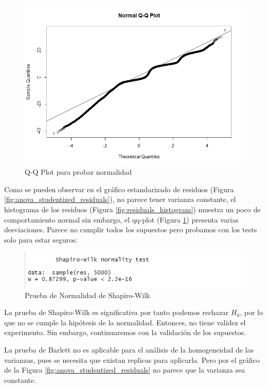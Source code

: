 \documentclass[a4paper,10pt,twocolumn]{report}
\begin{document}
	\begin{figure}[H]
		\includegraphics[width=0.9\linewidth]{img/anova/NormalQQPlot}
		\caption{Q-Q Plot para probar normalidad}
		\label{fig:NormalQQPlot}
	\end{figure}

	Como se pueden observar en el gráfico estandarizado de residuos (Figura \ref{fig:anova_studentized_residuals}), no parece tener varianza constante, el histograma de los residuos (Figura \ref{fig:residuals_histogram}) muestra un poco de comportamiento normal sin embargo, el qq-plot (Figura \ref{fig:NormalQQPlot}) presenta varias desviaciones. Parece no cumplir todos los supuestos pero probamos con los tests solo para estar seguros:
		
	\begin{figure}[H]
		\centering
		\includegraphics[width=\linewidth]{img/anova/shapiro}
		\caption{Prueba de Normalidad de Shapiro-Wilk}
		\label{fig:shapiro}
	\end{figure}

	La prueba de Shapiro-Wilk es significativa por tanto podemos rechazar $H_0$, por lo que no se cumple la hipótesis de la normalidad. Entonces, no tiene validez el experimento. Sin embargo, continuaremos con la validación de los supuestos.
	
	La prueba de Barlett no es aplicable para el análisis de la homogeneidad de las varianzas, pues se necesita que existan replicas para aplicarla. Pero por el gráfico de la Figura \ref{fig:anova_studentized_residuals} no parece que la varianza sea constante.
	 
\end{document}
